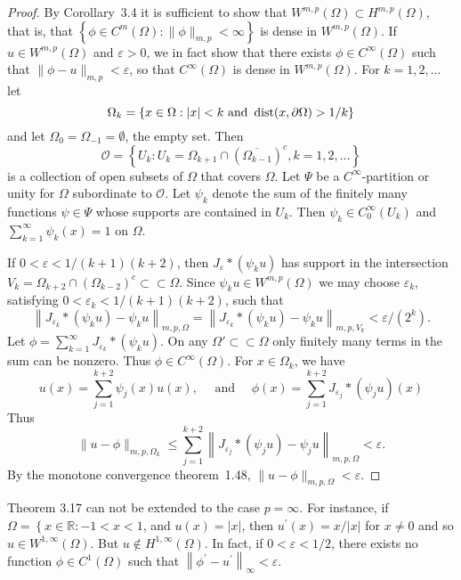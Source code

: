 \begin{proof}
  By Corollary~3.4 it is sufficient to show that $W^{m,p}(\Omega) \subset H^{m, p}(\Omega)$,
  that is, that $\left\{\phi \in C^m(\Omega):\|\phi\|_{m,p}<\infty\right\}$
  is dense in $W^{m,p}(\Omega)$. If $u \in W^{m,p}(\Omega)$ and $\varepsilon>0$,
  we in fact show that there exists $\phi \in C^{\infty}(\Omega)$
  such that $\|\phi-u\|_{m,p}<\varepsilon$, so that $C^{\infty}(\Omega)$ is dense
  in $W^{m,p}(\Omega)$. For $k=1,2, \ldots$ let
  \[
  \Omega_k=\{x \in \Omega:|x|<k \text { and } \operatorname{dist}(x, \partial\Omega)>1/k\}
  \]
  and let $\Omega_0=\Omega_{-1}=\emptyset$, the empty set. Then
  \[
  \mathscr{O} = \left\{U_k: U_k=\Omega_{k+1} \cap\left(\overline{\Omega_{k-1}}\right)^c, k=1,2, \ldots\right\}
  \]
  is a collection of open subsets of $\Omega$ that covers $\Omega$.
  Let $\Psi$ be a $C^{\infty}$-partition or unity for $\Omega$ subordinate to $\mathscr{O}$.
  Let $\psi_k$ denote the sum of the finitely many functions $\psi \in \Psi$ whose supports are 
  contained in $U_k$.
  Then $\psi_k \in C_0^{\infty}\left(U_k\right)$ and $\sum_{k=1}^{\infty} \psi_k(x)=1$ on $\Omega$.
  
  If $0<\varepsilon<1 /(k+1)(k+2)$, then $J_\varepsilon *\left(\psi_k u\right)$ has support in the 
  intersection $V_k=\Omega_{k+2} \cap\left(\Omega_{k-2}\right)^c \subset\subset \Omega$.
  Since $\psi_k u \in W^{m,p}(\Omega)$ we may choose $\varepsilon_k$,
  satisfying $0<\varepsilon_k<1 /(k+1)(k+2)$, such that
  \[
    \left\|J_{\varepsilon_k} *\left(\psi_k u\right)-\psi_k u\right\|_{m, p, \Omega}=\left\|J_{\varepsilon_k} *\left(\psi_k u\right)-\psi_k u\right\|_{m, p, V_k}<\varepsilon /(2^k) .
  \]
  Let $\phi=\sum_{k=1}^{\infty} J_{\varepsilon_k} *\left(\psi_k u\right)$.
  On any $\Omega' \subset\subset \Omega$ only finitely many terms in the sum can be nonzero.
  Thus $\phi \in C^{\infty}(\Omega)$. For $x \in \Omega_k$, we have
  \[
    u(x)=\sum_{j=1}^{k+2} \psi_j(x) u(x), \quad \text { and } \quad \phi(x)=\sum_{j=1}^{k+2} J_{\varepsilon_j} *\left(\psi_j u\right)(x)
  \]
  Thus
  \[
    \|u-\phi\|_{m, p, \Omega_k} \leq \sum_{j=1}^{k+2}\left\|J_{\varepsilon_j} *\left(\psi_j u\right)-\psi_j u\right\|_{m, p, \Omega}<\varepsilon .
  \]
  By the monotone convergence theorem~1.48, $\|u-\phi\|_{m, p, \Omega}<\varepsilon$.
\end{proof}


\begin{example}
  Theorem 3.17 can not be extended to the case $p=\infty$.
  For instance, if $\Omega=\left\{x \in \mathbb{R}:-1<x<1\right.$,
  and $u(x)=|x|$, then $u^{\prime}(x)=x /|x|$ for $x \neq 0$ and so $u \in W^{1, \infty}(\Omega)$. 
  But $u \notin H^{1,\infty}(\Omega)$. In fact, if $0<\varepsilon<1 / 2$,
  there exists no function $\phi \in C^1(\Omega)$ such that $\left\|\phi^{\prime}-u^{\prime}\right\|_{\infty}<\varepsilon$.
\end{example}


